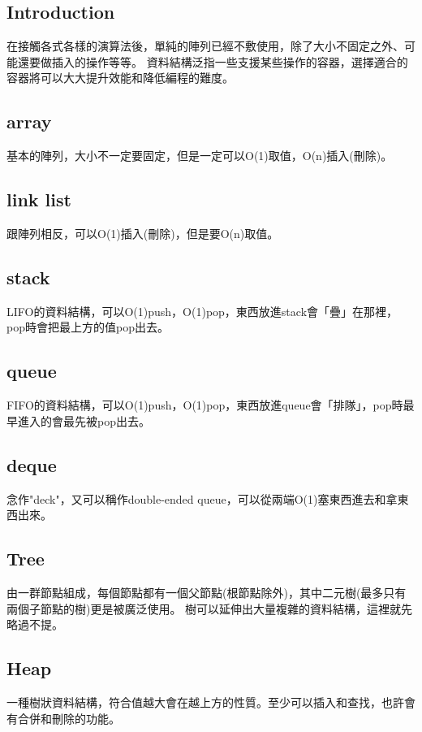 \documentclass{article}
\begin{document}
\subsection*{Introduction}
在接觸各式各樣的演算法後，單純的陣列已經不敷使用，除了大小不固定之外、可能還要做插入的操作等等。
資料結構泛指一些支援某些操作的容器，選擇適合的容器將可以大大提升效能和降低編程的難度。

\subsection{array}
基本的陣列，大小不一定要固定，但是一定可以O(1)取值，O(n)插入(刪除)。

\subsection{link list}
跟陣列相反，可以O(1)插入(刪除)，但是要O(n)取值。

\subsection{stack}
LIFO的資料結構，可以O(1)push，O(1)pop，東西放進stack會「疊」在那裡，pop時會把最上方的值pop出去。

\subsection{queue}
FIFO的資料結構，可以O(1)push，O(1)pop，東西放進queue會「排隊」，pop時最早進入的會最先被pop出去。

\subsection{deque}
念作"deck"，又可以稱作double-ended queue，可以從兩端O(1)塞東西進去和拿東西出來。

\subsection{Tree}
由一群節點組成，每個節點都有一個父節點(根節點除外)，其中二元樹(最多只有兩個子節點的樹)更是被廣泛使用。
樹可以延伸出大量複雜的資料結構，這裡就先略過不提。

\subsection{Heap}
一種樹狀資料結構，符合值越大會在越上方的性質。至少可以插入和查找，也許會有合併和刪除的功能。
\end{document}

